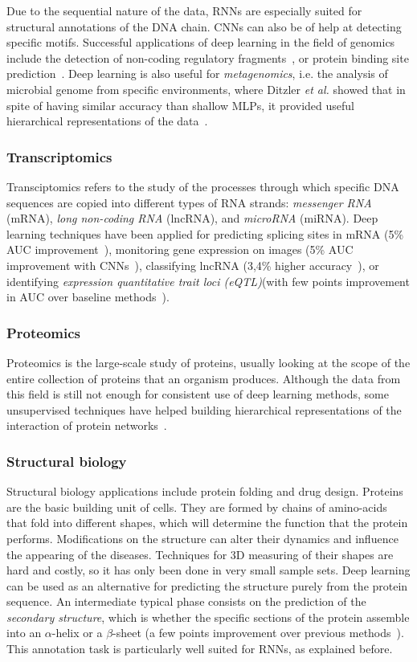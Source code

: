 Due to the sequential nature of the data, RNNs are especially suited for structural annotations of the DNA chain. CNNs can also be of help at detecting specific motifs. Successful applications of deep learning in the field of genomics include the detection of non-coding regulatory fragments~\cite{Zhou2015}, or protein binding site prediction~\cite{Alipanahi2015}. Deep learning is also useful for \textit{metagenomics}, i.e. the analysis of microbial genome from specific environments, where Ditzler \textit{et al.} showed that in spite of having similar accuracy than shallow MLPs, it provided useful hierarchical representations of the data~\cite{Ditzler2015}.

\subsubsection{Transcriptomics}
Transciptomics refers to the study of the processes through which specific DNA sequences are copied into different types of RNA strands: \textit{messenger RNA} (mRNA), \textit{long non-coding RNA} (lncRNA), and \textit{microRNA} (miRNA). Deep learning techniques have been applied for predicting splicing sites in mRNA (5\% AUC improvement~\cite{Leung2014}), monitoring gene expression on images (5\% AUC improvement with CNNs~\cite{Zeng2015}), classifying lncRNA (3,4\% higher accuracy~\cite{Fan2015}), or identifying \textit{expression quantitative trait loci (eQTL)}(with few points improvement in AUC over baseline methods~\cite{Witteveen2014}).

\subsubsection{Proteomics}
Proteomics is the large-scale study of proteins, usually looking at the scope of the entire collection of proteins that an organism produces. Although the data from this field is still not enough for consistent use of deep learning methods, some unsupervised techniques have helped building hierarchical representations of the interaction of protein networks~\cite{Chen2015}.

\subsubsection{Structural biology}
Structural biology applications include protein folding and drug design. Proteins are the basic building unit of cells. They are formed by chains of amino-acids that fold into different shapes, which will determine the function that the protein performs. Modifications on the structure can alter their dynamics and influence the appearing of the diseases. Techniques for 3D measuring of their shapes are hard and costly, so it has only been done in very small sample sets. Deep learning can be used as an alternative for predicting the structure purely from the protein sequence. An intermediate typical phase consists on the prediction of the \textit{secondary structure}, which is whether the specific sections of the protein assemble into an $\alpha$-helix or a $\beta$-sheet (a few points improvement  over previous methods~\cite{Jurtz2017}). This annotation task is particularly well suited for RNNs, as explained before.

